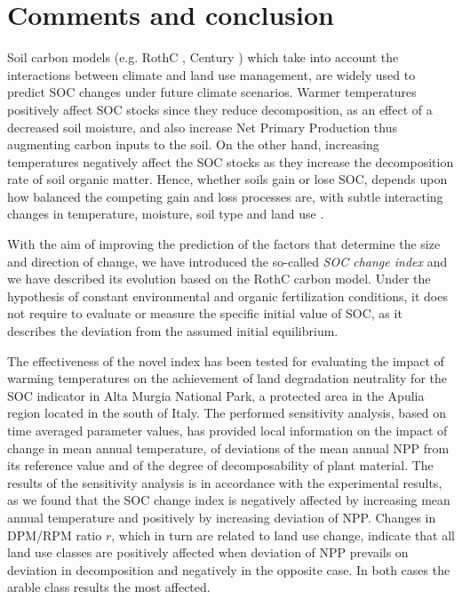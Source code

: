 \section{Comments and conclusion}\label{sec:8}
Soil carbon models (e.g. RothC \cite{coleman1996rothc}, Century \cite{parton1996century}) which take into account the interactions between climate and  land use management, are widely used to predict SOC changes under future climate scenarios.  Warmer temperatures  positively affect SOC stocks since they reduce decomposition, as an effect of a decreased soil moisture, and also increase Net Primary Production thus augmenting carbon inputs to the soil. On the other hand,  increasing temperatures negatively affect the SOC stocks as they increase the decomposition rate of soil organic matter. Hence, whether  soils gain or lose SOC, depends upon how balanced the competing gain and loss processes are, with subtle interacting changes in  temperature, moisture, soil type and land use \cite{gottschalk2012will}.


\noindent With the aim of  
improving the prediction of the factors that determine the size and direction of change, we have introduced  the so-called  {\it SOC change index} and we have described its evolution based on  the RothC carbon model. Under the hypothesis of constant environmental and organic fertilization conditions, it does not require to evaluate or measure the specific initial value of SOC,  as it describes the deviation from the assumed  initial equilibrium. 
 
 
\noindent  The effectiveness of the novel index has been tested  for evaluating the  impact of warming temperatures on the achievement  of land degradation neutrality for the SOC indicator in Alta Murgia National Park, a protected area in the Apulia region located in the south of Italy.  The performed sensitivity analysis, based on time averaged parameter values, has provided local information on the impact of change in mean annual temperature,  of deviations of the mean annual NPP from its reference value and of the degree of decomposability of plant material.  The results of the sensitivity analysis is in  accordance with the experimental results, as we found that the SOC change index is negatively affected by increasing mean annual temperature and positively by increasing deviation of NPP. Changes in DPM/RPM ratio  $r$, which in turn are related to land use change, indicate that all land use classes are positively affected when deviation of NPP prevails on deviation in decomposition and negatively in the opposite case. In both cases the arable class results the most affected.   



